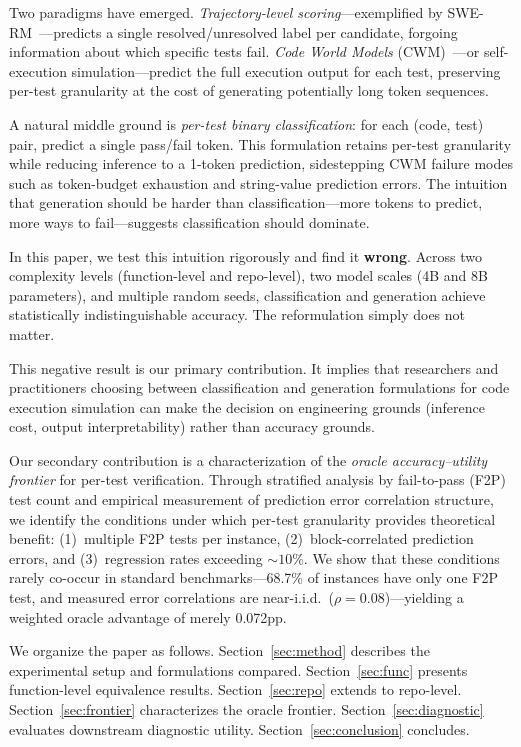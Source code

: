\documentclass[11pt,a4paper]{article}
\begin{document}
Two paradigms have emerged.
\emph{Trajectory-level scoring}---exemplified by SWE-RM~\cite{zhang2025swerm}---predicts a single resolved/unresolved label per candidate, forgoing information about which specific tests fail.
\emph{Code World Models} (CWM)~\cite{ding2024semcoder}---or self-execution simulation---predict the full execution output for each test, preserving per-test granularity at the cost of generating potentially long token sequences.

A natural middle ground is \emph{per-test binary classification}: for each (code, test) pair, predict a single pass/fail token.
This formulation retains per-test granularity while reducing inference to a 1-token prediction, sidestepping CWM failure modes such as token-budget exhaustion and string-value prediction errors.
The intuition that generation should be harder than classification---more tokens to predict, more ways to fail---suggests classification should dominate.

In this paper, we test this intuition rigorously and find it \textbf{wrong}.
Across two complexity levels (function-level and repo-level), two model scales (4B and 8B parameters), and multiple random seeds, classification and generation achieve statistically indistinguishable accuracy.
The reformulation simply does not matter.

This negative result is our primary contribution.
It implies that researchers and practitioners choosing between classification and generation formulations for code execution simulation can make the decision on engineering grounds (inference cost, output interpretability) rather than accuracy grounds.

Our secondary contribution is a characterization of the \emph{oracle accuracy--utility frontier} for per-test verification.
Through stratified analysis by fail-to-pass (F2P) test count and empirical measurement of prediction error correlation structure, we identify the conditions under which per-test granularity provides theoretical benefit: (1)~multiple F2P tests per instance, (2)~block-correlated prediction errors, and (3)~regression rates exceeding ${\sim}10\%$.
We show that these conditions rarely co-occur in standard benchmarks---68.7\% of instances have only one F2P test, and measured error correlations are near-i.i.d.\ ($\rho{=}0.08$)---yielding a weighted oracle advantage of merely 0.072pp.

We organize the paper as follows. Section~\ref{sec:method} describes the experimental setup and formulations compared. Section~\ref{sec:func} presents function-level equivalence results. Section~\ref{sec:repo} extends to repo-level. Section~\ref{sec:frontier} characterizes the oracle frontier. Section~\ref{sec:diagnostic} evaluates downstream diagnostic utility. Section~\ref{sec:conclusion} concludes.
\end{document}
